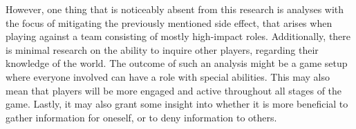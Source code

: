 However, one thing that is noticeably absent from this research is analyses
with the focus of mitigating the previously mentioned side effect, that arises
when playing against a team consisting of mostly high-impact roles.
Additionally, there is minimal research on the ability to inquire other
players, regarding their knowledge of the world. The outcome of such an
analysis might be a game setup where everyone involved can have a role with
special abilities. This may also mean that players will be more engaged and
active throughout all stages of the game. Lastly, it may also grant some
insight into whether it is more beneficial to gather information for oneself,
or to deny information to others.